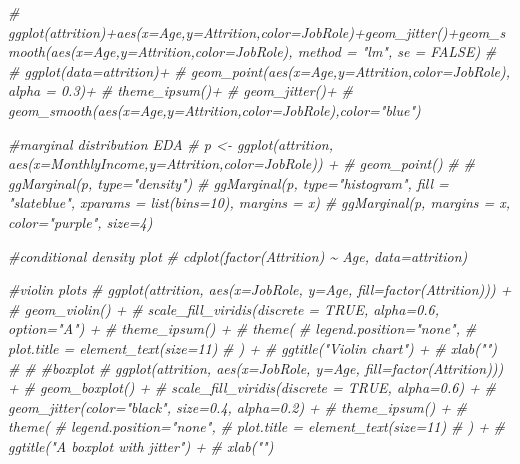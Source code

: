 \documentclass[
]{article}
\newenvironment{Shaded}{\begin{snugshade}}{\end{snugshade}}
\newcommand{\CommentTok}[1]{\textcolor[rgb]{0.56,0.35,0.01}{\textit{#1}}}
\begin{document}
\begin{Shaded}
\begin{Highlighting}[]
\CommentTok{\# ggplot(attrition)+aes(x=Age,y=Attrition,color=JobRole)+geom\_jitter()+geom\_smooth(aes(x=Age,y=Attrition,color=JobRole), method = "lm", se = FALSE)}
\CommentTok{\# }
\CommentTok{\# ggplot(data=attrition)+}
\CommentTok{\#   geom\_point(aes(x=Age,y=Attrition,color=JobRole), alpha = 0.3)+}
\CommentTok{\#   theme\_ipsum()+}
\CommentTok{\#   geom\_jitter()+}
\CommentTok{\#   geom\_smooth(aes(x=Age,y=Attrition,color=JobRole),color="blue")}
\end{Highlighting}
\end{Shaded}

\begin{Shaded}
\begin{Highlighting}[]
\CommentTok{\#marginal distribution EDA}
\CommentTok{\# p \textless{}{-} ggplot(attrition, aes(x=MonthlyIncome,y=Attrition,color=JobRole)) +}
\CommentTok{\#         geom\_point()}
\CommentTok{\# }
\CommentTok{\# ggMarginal(p, type="density")}
\CommentTok{\# ggMarginal(p, type="histogram", fill = "slateblue", xparams = list(bins=10), margins = \textquotesingle{}x\textquotesingle{})}
\CommentTok{\# ggMarginal(p, margins = \textquotesingle{}x\textquotesingle{}, color="purple", size=4)}

\CommentTok{\#conditional density plot}
\CommentTok{\# cdplot(factor(Attrition) \textasciitilde{} Age, data=attrition)}

\CommentTok{\#violin plots}
\CommentTok{\# ggplot(attrition, aes(x=JobRole, y=Age, fill=factor(Attrition))) +}
\CommentTok{\#     geom\_violin() +}
\CommentTok{\#     scale\_fill\_viridis(discrete = TRUE, alpha=0.6, option="A") +}
\CommentTok{\#     theme\_ipsum() +}
\CommentTok{\#     theme(}
\CommentTok{\#       legend.position="none",}
\CommentTok{\#       plot.title = element\_text(size=11)}
\CommentTok{\#     ) +}
\CommentTok{\#     ggtitle("Violin chart") +}
\CommentTok{\#     xlab("")}
\CommentTok{\# }
\CommentTok{\# \#boxplot}
\CommentTok{\# ggplot(attrition, aes(x=JobRole, y=Age, fill=factor(Attrition))) +}
\CommentTok{\#     geom\_boxplot() +}
\CommentTok{\#     scale\_fill\_viridis(discrete = TRUE, alpha=0.6) +}
\CommentTok{\#     geom\_jitter(color="black", size=0.4, alpha=0.2) +}
\CommentTok{\#     theme\_ipsum() +}
\CommentTok{\#     theme(}
\CommentTok{\#       legend.position="none",}
\CommentTok{\#       plot.title = element\_text(size=11)}
\CommentTok{\#     ) +}
\CommentTok{\#     ggtitle("A boxplot with jitter") +}
\CommentTok{\#     xlab("")}
\end{Highlighting}
\end{Shaded}
\end{document}
